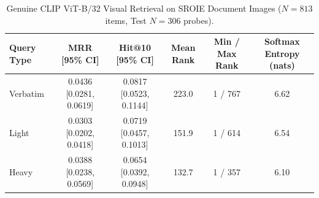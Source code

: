 \begin{table}[t]
\centering\small
\caption{Genuine CLIP ViT-B/32 Visual Retrieval on SROIE Document Images ($N=813$ items, Test $N=306$ probes).}\label{tab:clip_v6}
\begin{tabular}{lccccc}
\toprule
Query Type & MRR [95\% CI] & Hit@10 [95\% CI] & Mean Rank & Min / Max Rank & Softmax Entropy (nats) \\
\midrule
Verbatim & 0.0436 [0.0281, 0.0619] & 0.0817 [0.0523, 0.1144] & 223.0 & 1 / 767 & 6.62 \\
Light & 0.0303 [0.0202, 0.0418] & 0.0719 [0.0457, 0.1013] & 151.9 & 1 / 614 & 6.54 \\
Heavy & 0.0388 [0.0238, 0.0569] & 0.0654 [0.0392, 0.0948] & 132.7 & 1 / 357 & 6.10 \\
\bottomrule
\end{tabular}
\end{table}
